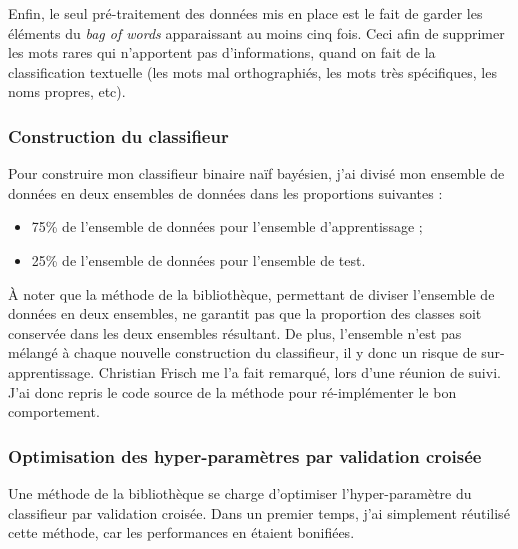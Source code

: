                 Enfin, le seul pré-traitement des données mis en place est le fait de garder les éléments du \textit{bag of words} apparaissant au moins cinq fois. Ceci afin de supprimer les mots rares qui n'apportent pas d'informations, quand on fait de la classification textuelle (les mots mal orthographiés, les mots très spécifiques, les noms propres, etc).

            \subsubsection{Construction du classifieur}
                Pour construire mon classifieur binaire naïf bayésien, j'ai divisé mon ensemble de données en deux ensembles de données dans les proportions suivantes :
                \begin{itemize}
                    \item 75\% de l'ensemble de données pour l'ensemble d'apprentissage ;
                    \item 25\% de l'ensemble de données pour l'ensemble de test.\\
                \end{itemize}
                À noter que la méthode de la bibliothèque, permettant de diviser l'ensemble de données en deux ensembles, ne garantit pas que la proportion des classes soit conservée dans les deux ensembles résultant. De plus, l'ensemble n'est pas mélangé à chaque nouvelle construction du classifieur, il y donc un risque de sur-apprentissage. Christian Frisch me l'a fait remarqué, lors d'une réunion de suivi. J'ai donc repris le code source de la méthode pour ré-implémenter le bon comportement.

            \subsubsection{Optimisation des hyper-paramètres par validation croisée}
                Une méthode de la bibliothèque se charge d'optimiser l'hyper-paramètre du classifieur par validation croisée. Dans un premier temps, j'ai simplement réutilisé cette méthode, car les performances en étaient bonifiées.

